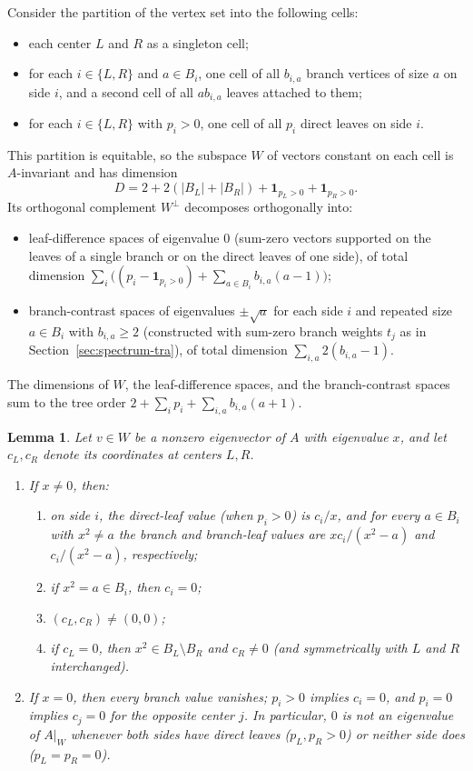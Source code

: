 \documentclass[11pt]{article}
\theoremstyle{plain}
\newtheorem{lemma}[theorem]{Lemma}
\theoremstyle{remark}
\begin{document}
Consider the partition of the vertex set into the following cells:
\begin{itemize}
\item each center $L$ and $R$ as a singleton cell;
\item for each $i \in \{L,R\}$ and $a \in B_i$, one cell of all $b_{i,a}$
  branch vertices of size $a$ on side $i$, and a second cell of all
  $a b_{i,a}$ leaves attached to them;
\item for each $i \in \{L,R\}$ with $p_i > 0$, one cell of all $p_i$ direct
  leaves on side $i$.
\end{itemize}
This partition is equitable, so the subspace $W$ of vectors constant on each
cell is $A$-invariant and has dimension
\[
  D = 2 + 2(|B_L| + |B_R|) + \mathbf{1}_{p_L > 0} + \mathbf{1}_{p_R > 0}.
\]
Its orthogonal complement $W^\perp$ decomposes orthogonally into:
\begin{itemize}
\item leaf-difference spaces of eigenvalue $0$ (sum-zero vectors supported on
  the leaves of a single branch or on the direct leaves of one side), of total
  dimension
  $\sum_{i}\bigl((p_i - \mathbf{1}_{p_i>0}) + \sum_{a\in B_i} b_{i,a}(a-1)\bigr)$;
\item branch-contrast spaces of eigenvalues $\pm\sqrt{a}$ for each side $i$ and
  repeated size $a \in B_i$ with $b_{i,a} \geq 2$ (constructed with sum-zero
  branch weights $t_j$ as in Section~\ref{sec:spectrum-tra}), of total
  dimension $\sum_{i,a} 2(b_{i,a} - 1)$.
\end{itemize}
The dimensions of $W$, the leaf-difference spaces, and the branch-contrast
spaces sum to the tree order $2 + \sum_i p_i + \sum_{i,a} b_{i,a}(a+1)$.

\begin{lemma}\label{lem:radial-equations}
Let $v \in W$ be a nonzero eigenvector of $A$ with eigenvalue $x$, and let
$c_L, c_R$ denote its coordinates at centers $L,R$.
\begin{enumerate}
\item If $x \neq 0$, then:
  \begin{enumerate}
  \item on side $i$, the direct-leaf value (when $p_i > 0$) is $c_i / x$, and
    for every $a \in B_i$ with $x^2 \neq a$ the branch and branch-leaf values
    are $x c_i / (x^2-a)$ and $c_i / (x^2-a)$, respectively;
  \item if $x^2 = a \in B_i$, then $c_i = 0$;
  \item $(c_L, c_R) \neq (0,0)$;
  \item if $c_L = 0$, then $x^2 \in B_L \setminus B_R$ and $c_R \neq 0$ (and
    symmetrically with $L$ and $R$ interchanged).
  \end{enumerate}
\item If $x = 0$, then every branch value vanishes; $p_i > 0$ implies
  $c_i = 0$, and $p_i = 0$ implies $c_j = 0$ for the opposite center $j$. In
  particular, $0$ is not an eigenvalue of $A|_W$ whenever both sides have
  direct leaves ($p_L, p_R > 0$) or neither side does ($p_L = p_R = 0$).
\end{enumerate}
\end{lemma}
\end{document}
